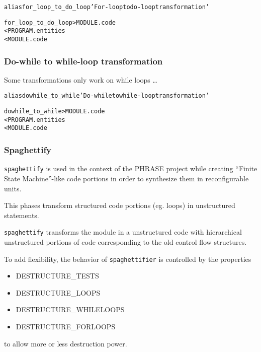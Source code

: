 \documentclass[a4paper]{report}
\newenvironment{PipsMake}{\begin{alltt}}{\end{alltt}}
\begin{document}
\begin{PipsMake}
alias for_loop_to_do_loop 'For-loop to do-loop transformation'

for_loop_to_do_loop          > MODULE.code
        < PROGRAM.entities
        < MODULE.code
\end{PipsMake}

\subsubsection{Do-while to while-loop transformation}
\label{sec:do-while to while-loop}

Some transformations only work on while loops \dots{}

\begin{PipsMake}
alias dowhile_to_while 'Do-while to while-loop transformation'

dowhile_to_while          > MODULE.code
        < PROGRAM.entities
        < MODULE.code
\end{PipsMake}


\subsubsection{Spaghettify}
\label{paragraph-spaghettify}

\texttt{spaghettify} is used in the context of the PHRASE project while
creating ``Finite State Machine''-like code portions in order to
synthesize them in reconfigurable units.

This phases transform structured code portions (eg. loops) in
unstructured statements.

\texttt{spaghettify} transforms the module in a unstructured code with
hierarchical unstructured portions of code corresponding to the old
control flow structures.

To add flexibility, the behavior of \texttt{spaghettifier} is
controlled by the properties
\begin{itemize}
\item{DESTRUCTURE\_TESTS}
\item{DESTRUCTURE\_LOOPS}
\item{DESTRUCTURE\_WHILELOOPS}
\item{DESTRUCTURE\_FORLOOPS}
\end{itemize}
to allow more or less destruction power.
\end{document}
